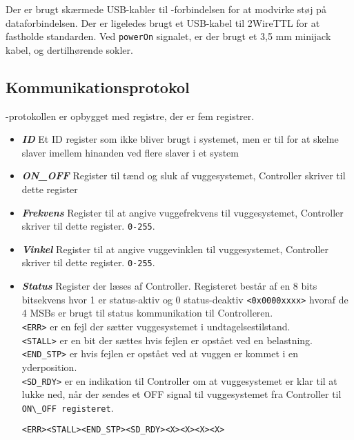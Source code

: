 Der er brugt skærmede USB-kabler til \iic-forbindelsen for at modvirke støj på dataforbindelsen. Der er ligeledes brugt et USB-kabel til 2WireTTL for at fastholde standarden. Ved \verb+powerOn+ signalet, er der brugt et 3,5 mm minijack kabel, og dertilhørende sokler.

\subsection{Kommunikationsprotokol}

\iic-protokollen er opbygget med registre, der er fem registrer.

\begin{itemize}
\item \textbf{\textit{ID}} Et ID register som ikke bliver brugt i systemet, men er til for at skelne \iic slaver imellem hinanden ved flere slaver i et system
\item \textbf{\textit{ON\_OFF}} Register til tænd og sluk af vuggesystemet, Controller skriver til dette register
\item \textbf{\textit{Frekvens}} Register til at angive vuggefrekvens til vuggesystemet, Controller skriver til dette register. \verb+0-255+.
\item \textbf{\textit{Vinkel}} Register til at angive vuggevinklen til vuggesystemet, Controller skriver til dette register. \verb+0-255+.
\item \textbf{\textit{Status}} Register der læses af Controller. Registeret består af en 8 bits bitsekvens hvor 1 er status-aktiv og 0 status-deaktiv \verb+<0x0000xxxx>+ hvoraf de 4 MSBs er brugt til status kommunikation til Controlleren.\\ 
\verb+<ERR>+ er en fejl der sætter vuggesystemet i undtagelsestilstand. \\
\verb+<STALL>+ er en bit der sættes hvis fejlen er opstået ved en belastning. \\
\verb+<END_STP>+ er hvis fejlen er opstået ved at vuggen er kommet i en yderposition. \\
\verb+<SD_RDY>+ er en indikation til Controller om at vuggesystemet er klar til at lukke ned, når der sendes et OFF signal til vuggesystemet fra Controller til \verb+ON\_OFF registeret+. 
\begin{center}
\verb+<ERR><STALL><END_STP><SD_RDY><X><X><X><X>+
\end{center}
\end{itemize}

